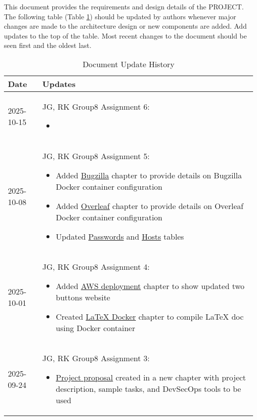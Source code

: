 This document provides the requirements and design details of the
PROJECT.  The following table (Table \ref{Table::UpdateHistory}) should be
updated by authors whenever major changes are made to the architecture
design or new components are added. Add updates to the top of the table.  
Most recent changes to the document should be seen first and the oldest 
last.

\begin{longtable}{|l||p{13.5cm}|}
\caption{Document Update History \label{Table::UpdateHistory}}\\
\hline
\textbf{Date} & \textbf{Updates} \\
\hline 
\endhead

2025-10-15 & JG, RK Group8 Assignment 6:
\begin{itemize}[topsep=0pt,itemsep=0pt,parsep=0pt,partopsep=0pt,leftmargin=12pt]
\item 
\end{itemize} 
\\ \hline

2025-10-08 & JG, RK Group8 Assignment 5:
\begin{itemize}[topsep=0pt,itemsep=0pt,parsep=0pt,partopsep=0pt,leftmargin=12pt]
\item Added \hyperref[ch:bugzilla]{Bugzilla} chapter to provide details on Bugzilla Docker container configuration
\item Added \hyperref[ch:overleaf]{Overleaf} chapter to provide details on Overleaf Docker container configuration
\item Updated \hyperref[ch:passwords]{Passwords} and \hyperref[ch:hosts]{Hosts} tables
\end{itemize} 
\\ \hline

2025-10-01 & JG, RK Group8 Assignment 4:
\begin{itemize}[topsep=0pt,itemsep=0pt,parsep=0pt,partopsep=0pt,leftmargin=12pt]
\item Added \hyperref[ch:aws-deployment]{AWS deployment} chapter to show updated two buttons website
\item Created \hyperref[ch:latex-docker]{LaTeX Docker} chapter to compile LaTeX doc using Docker container
\end{itemize} 
\\ \hline

2025-09-24 & JG, RK Group8 Assignment 3:
\begin{itemize}[topsep=0pt,itemsep=0pt,parsep=0pt,partopsep=0pt,leftmargin=12pt]
\item \hyperref[ch:proposal]{Project proposal} created in a new chapter with project description, sample tasks, and DevSecOps tools to be used
\end{itemize} 
\\ \hline


\end{longtable}
